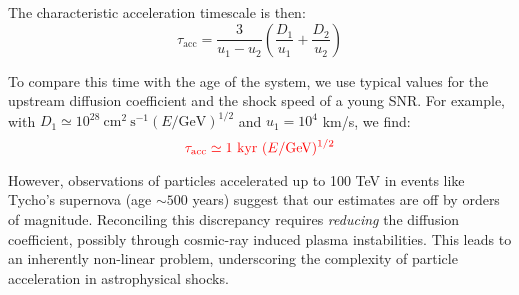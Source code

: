 The characteristic acceleration timescale is then:
%
\begin{equation}
\tau_{\text{acc}} = \frac{3}{u_1 - u_2} \left( \frac{D_1}{u_1} + \frac{D_2}{u_2} \right)
\end{equation}

To compare this time with the age of the system, we use typical values for the upstream diffusion coefficient and the shock speed of a young SNR. For example, with \( D_1 \simeq 10^{28}~\text{cm}^2~\text{s}^{-1} (E/\text{GeV})^{1/2} \) and \( u_1 = 10^4 \) km/s, we find:
%
\begin{equation}
{\color{red}\tau_{\text{acc}} \simeq 1~\text{kyr}~(E/\text{GeV})^{1/2}}
\end{equation}

However, observations of particles accelerated up to 100 TeV in events like Tycho's supernova (age \( \sim 500 \) years) suggest that our estimates are off by orders of magnitude. Reconciling this discrepancy requires \emph{reducing} the diffusion coefficient, possibly through cosmic-ray induced plasma instabilities. This leads to an inherently non-linear problem, underscoring the complexity of particle acceleration in astrophysical shocks.